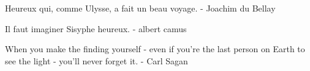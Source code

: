 Heureux qui, comme Ulysse, a fait un beau voyage. - Joachim du Bellay

Il faut imaginer Sisyphe heureux. - albert camus

When you make the finding yourself - even if you're the last person on Earth to see the light - you'll never forget it. - Carl Sagan
